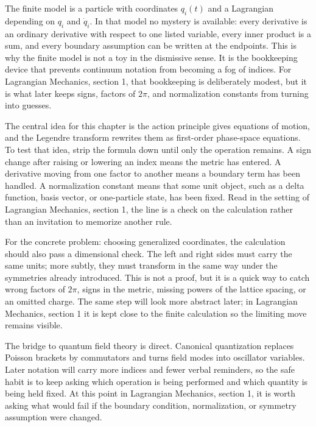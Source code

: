 The finite model is a particle with coordinates \(q_i(t)\) and a Lagrangian depending on \(q_i\) and \(\dot q_i\).  In that model no mystery is available: every derivative is an ordinary derivative with respect to one listed variable, every inner product is a sum, and every boundary assumption can be written at the endpoints.  This is why the finite model is not a toy in the dismissive sense.  It is the bookkeeping device that prevents continuum notation from becoming a fog of indices.  For Lagrangian Mechanics, section 1, that bookkeeping is deliberately modest, but it is what later keeps signs, factors of \(2\pi\), and normalization constants from turning into guesses.

The central idea for this chapter is the action principle gives equations of motion, and the Legendre transform rewrites them as first-order phase-space equations.  To test that idea, strip the formula down until only the operation remains.  A sign change after raising or lowering an index means the metric has entered.  A derivative moving from one factor to another means a boundary term has been handled.  A normalization constant means that some unit object, such as a delta function, basis vector, or one-particle state, has been fixed.  Read in the setting of Lagrangian Mechanics, section 1, the line is a check on the calculation rather than an invitation to memorize another rule.

For the concrete problem: choosing generalized coordinates, the calculation should also pass a dimensional check.  The left and right sides must carry the same units; more subtly, they must transform in the same way under the symmetries already introduced.  This is not a proof, but it is a quick way to catch wrong factors of \(2\pi\), signs in the metric, missing powers of the lattice spacing, or an omitted charge.  The same step will look more abstract later; in Lagrangian Mechanics, section 1 it is kept close to the finite calculation so the limiting move remains visible.

The bridge to quantum field theory is direct.  Canonical quantization replaces Poisson brackets by commutators and turns field modes into oscillator variables.  Later notation will carry more indices and fewer verbal reminders, so the safe habit is to keep asking which operation is being performed and which quantity is being held fixed.  At this point in Lagrangian Mechanics, section 1, it is worth asking what would fail if the boundary condition, normalization, or symmetry assumption were changed.

